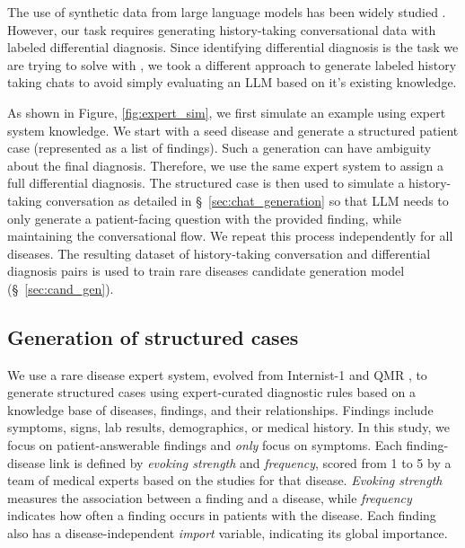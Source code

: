 
The use of synthetic data from large language models has been widely studied \cite{li-etal-2023-synthetic,yu2023training,liu2024best}. However, our task requires generating history-taking conversational data with labeled differential diagnosis. Since identifying differential diagnosis is the task we are trying to solve with \methodname, we took a different approach to generate labeled history taking chats to avoid simply evaluating an LLM based on it's existing knowledge.


As shown in Figure, \ref{fig:expert_sim}, we first simulate an example using expert system knowledge.  We start with a seed disease and generate a structured patient case (represented as a list of findings). 
Such a generation can have ambiguity about the final diagnosis. Therefore, we use the same expert system to assign a full differential diagnosis. The structured case is then used to simulate a history-taking conversation as detailed in \S ~\ref{sec:chat_generation} so that LLM needs to only generate a patient-facing question with the provided finding, while maintaining the conversational flow. We repeat this process independently for all diseases. The resulting dataset of history-taking conversation and differential diagnosis pairs is used to train rare diseases candidate generation model (\S~\ref{sec:cand_gen}).

\subsection{Generation of structured cases}
\label{sec:vignette}

We use a rare disease expert system, evolved from Internist-1 \cite{miller_internist-1_1982} and QMR \cite{miller_qmr}, to generate structured cases using expert-curated diagnostic rules based on a knowledge base of diseases, findings, and their relationships. Findings include symptoms, signs, lab results, demographics, or medical history. In this study, we focus on patient-answerable findings and {\it only} focus on symptoms. Each finding-disease link is defined by \emph{evoking strength} and \emph{frequency}, scored from 1 to 5 by a team of medical experts based on the studies for that disease. \emph{Evoking strength} measures the association between a finding and a disease, while \emph{frequency} indicates how often a finding occurs in patients with the disease. Each finding also has a disease-independent \emph{import} variable, indicating its global importance.

